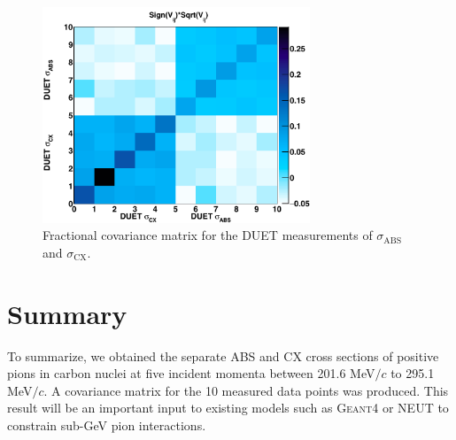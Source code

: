 \begin{figure}[h]
\begin{center}
\includegraphics[width=80mm]{figures/duet_covariance_for_research_evaluation_png.png}
\caption{Fractional covariance matrix for the DUET measurements of $\sigma_{\mathrm{ABS}}$ and $\sigma_{\mathrm{CX}}$. }
\label{fig:covariance}
\end{center} 
\end{figure}

\section{Summary}
To summarize, we obtained the separate ABS and CX cross sections of positive pions in carbon nuclei at five incident momenta between 201.6 MeV$/c$ to 295.1 MeV$/c$. A covariance matrix for the 10 measured data points was produced. This result will be an important input to existing models such as \textsc{Geant4} or \textsc{NEUT} to constrain sub-GeV pion interactions.
